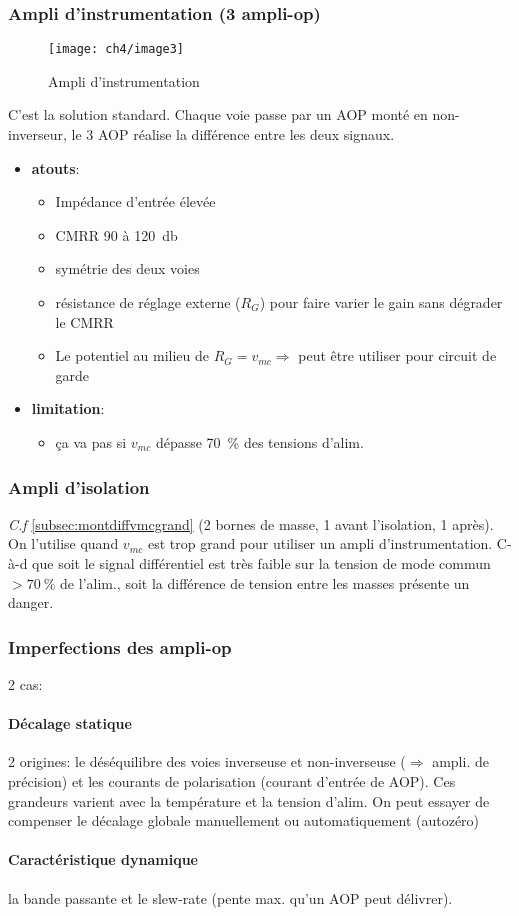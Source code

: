 \subsubsection{Ampli d'instrumentation (3 ampli-op)}
\begin{figure}[H] 
	\centering 
	\texttt{[image: ch4/image3]} 
	\caption{Ampli d'instrumentation} 
\end{figure}
C'est la solution standard. Chaque voie passe par un AOP monté en non-inverseur, le 3 AOP réalise la différence entre les deux signaux.
\begin{itemize}
	\item \textbf{atouts}:
	\begin{itemize}
		\item Impédance d'entrée élevée
		\item CMRR \num{90} à \SI{120}{\decibel}
		\item symétrie des deux voies
		\item résistance de réglage externe (\(R_G\)) pour faire varier le gain sans dégrader le CMRR
		\item Le potentiel au milieu de \(R_G = v_{mc}\Rightarrow\) peut être utiliser pour circuit de garde
	\end{itemize}
	\item \textbf{limitation}:
	\begin{itemize}
		\item ça va pas si \(v_{mc}\) dépasse \SI{70}{\percent} des tensions d'alim.
	\end{itemize}
\end{itemize}
\subsubsection{Ampli d'isolation}
\textit{C.f} \autoref{subsec:montdiffvmcgrand} (2 bornes de masse, 1 avant l'isolation, 1 après). On l'utilise quand \(v_{mc}\) est trop grand pour utiliser un ampli d'instrumentation. C-à-d que soit le signal différentiel est très faible sur la tension de mode commun \(>\SI{70}{\percent}\) de l'alim., soit la différence de tension entre les masses présente un danger.
\subsubsection{Imperfections des ampli-op}
2 cas:
\paragraph{Décalage statique} 2 origines: le déséquilibre des voies inverseuse et non-inverseuse (\(\Rightarrow\) ampli. de précision) et les courants de polarisation (courant d'entrée de AOP). Ces grandeurs varient avec la température et la tension d'alim. On peut essayer de compenser le décalage globale manuellement ou automatiquement (autozéro)
\paragraph{Caractéristique dynamique} la bande passante et le slew-rate (pente max. qu'un AOP peut délivrer).
